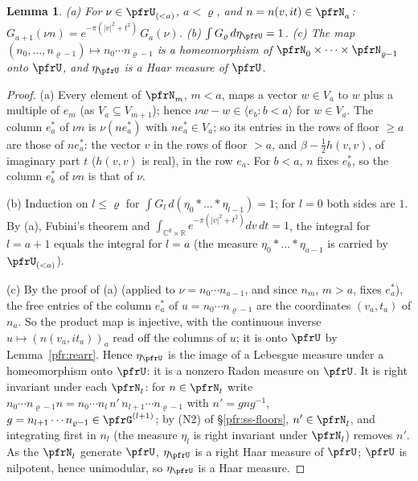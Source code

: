 \documentclass[10pt]{amsart}
\newtheorem{lemma}[theorem]{Lemma}
\theoremstyle{definition}
\theoremstyle{remark}
\newcommand{\C}{\mathbb C}
\newcommand{\R}{\mathbb R}
\begin{document}
\begin{lemma}\label{prp:heis}
\textup{(a)} For $\nu\in\pfrU_{(<a)}$, $a<\varrho$, and $n=n(v,it)\in\pfrN_a$:
$G_{a+1}(\nu n)=e^{-\pi(|v|^2+t^2)}\,G_a(\nu)$.
\textup{(b)} $\int G_\varrho\,d\eta_\pfrU=1$.
\textup{(c)} The map $(n_0,\dots,n_{\varrho-1})\mapsto n_0\cdots n_{\varrho-1}$ is a homeomorphism of
$\pfrN_0\times\dots\times\pfrN_{\varrho-1}$ onto $\pfrU$, and $\eta_\pfrU$ is a Haar measure of $\pfrU$.
\end{lemma}
\begin{proof}
(a) Every element of $\pfrN_m$, $m<a$, maps a vector $w\in V_a$ to $w$ plus a multiple of $e_m$ (as
$V_a\subseteq V_{m+1}$); hence $\nu w-w\in\langle e_b:b<a\rangle$ for $w\in V_a$. The column $e_a^*$ of $\nu n$ is
$\nu(ne_a^*)$ with $ne_a^*\in V_a$; so its entries in the rows of floor $\ge a$ are those of $ne_a^*$: the
vector $v$ in the rows of floor $>a$, and $\beta-\frac12h(v,v)$, of imaginary part $t$ ($h(v,v)$ is
real), in the row $e_a$. For $b<a$, $n$ fixes $e_b^*$, so the column $e_b^*$ of $\nu n$ is that of $\nu$.

(b) Induction on $l\le\varrho$ for $\int G_l\,d(\eta_0*\dots*\eta_{l-1})=1$; for $l=0$ both sides are
$1$. By (a), Fubini's theorem and $\int_{\C^d\times\R}e^{-\pi(|v|^2+t^2)}dv\,dt=1$, the integral for $l=a+1$
equals the integral for $l=a$ (the measure $\eta_0*\dots*\eta_{a-1}$ is carried by $\pfrU_{(<a)}$).

(c) By the proof of (a) (applied to $\nu=n_0\cdots n_{a-1}$, and since $n_m$, $m>a$, fixes $e_a^*$), the free
entries of the column $e_a^*$ of $u=n_0\cdots n_{\varrho-1}$ are the coordinates $(v_a,t_a)$ of $n_a$. So
the product map is injective, with the continuous inverse $u\mapsto(n(v_a,it_a))_a$ read off the columns
of $u$; it is onto $\pfrU$ by Lemma~\ref{pfr:rearr}. Hence $\eta_\pfrU$ is the image of a Lebesgue measure under
a homeomorphism onto $\pfrU$: it is a nonzero Radon measure on $\pfrU$. It is right invariant under each
$\pfrN_l$: for $n\in\pfrN_l$ write $n_0\cdots n_{\varrho-1}n=n_0\cdots n_l\,n'\,n_{l+1}\cdots n_{\varrho-1}$ with
$n'=gng^{-1}$, $g=n_{l+1}\cdots n_{\varrho-1}\in\pfrG^{(l+1)}$; by (N2) of \S\ref{pfr:ss-floors}, $n'\in\pfrN_l$,
and integrating first in $n_l$ (the measure $\eta_l$ is right invariant under $\pfrN_l$) removes $n'$. As
the $\pfrN_l$ generate $\pfrU$, $\eta_\pfrU$ is a right Haar measure of $\pfrU$; $\pfrU$ is nilpotent, hence
unimodular, so $\eta_\pfrU$ is a Haar measure.
\end{proof}
\end{document}
